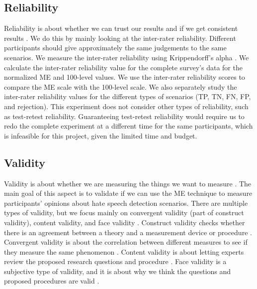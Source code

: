 \subsection{Reliability}
Reliability is about whether we can trust our results and if we get consistent results \citep{fitzner2007reliability}.
%
We do this by mainly looking at the inter-rater reliability.
%
Different participants should give approximately the same judgements to the same scenarios.
%
We measure the inter-rater reliability using Krippendorff's alpha \citep{maddalena2017crowdsourcing, krippendorff2004reliability}.
%
We calculate the inter-rater reliability value for the complete survey's data for the normalized ME and 100-level values.
%
We use the inter-rater reliability scores to compare the ME scale with the 100-level scale.
%
We also separately study the inter-rater reliability values for the different types of scenarios (TP, TN, FN, FP, and rejection).
%
This experiment does not consider other types of reliability, such as test-retest reliability.
%
Guaranteeing test-retest reliability would require us to redo the complete experiment at a different time for the same participants, which is infeasible for this project, given the limited time and budget.

\subsection{Validity}
\label{sec:analysis-validity}
Validity is about whether we are measuring the things we want to measure \citep{fitzner2007reliability}.
%
The main goal of this aspect is to validate if we can use the ME technique to measure participants' opinions about hate speech detection scenarios.
%
There are multiple types of validity, but we focus mainly on convergent validity (part of construct validity), content validity, and face validity \citep{fitzner2007reliability}.
%
Construct validity checks whether there is an agreement between a theory and a measurement device or procedure \citep{fitzner2007reliability}.
%
Convergent validity is about the correlation between different measures to see if they measure the same phenomenon \citep{fitzner2007reliability}.
%
Content validity is about letting experts review the proposed research questions and procedure \citep{fitzner2007reliability}.
%
Face validity is a subjective type of validity, and it is about why we think the questions and proposed procedures are valid \citep{fitzner2007reliability}.
%


